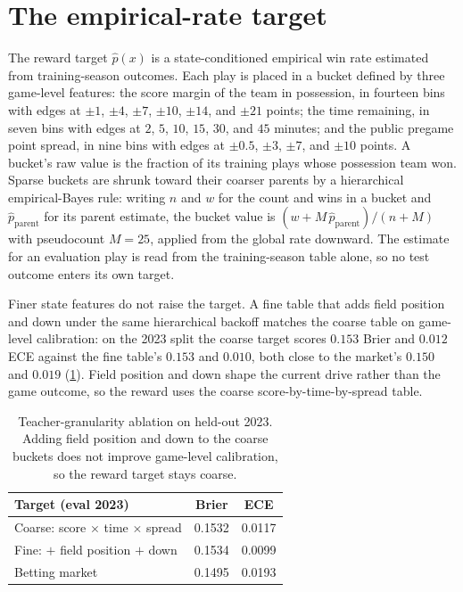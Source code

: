 
\section{The empirical-rate target}
\label{app:teacher}

The reward target $\hat p(x)$ is a state-conditioned empirical win rate estimated from
training-season outcomes. Each play is placed in a bucket defined by three game-level features: the
score margin of the team in possession, in fourteen bins with edges at $\pm1$, $\pm4$, $\pm7$,
$\pm10$, $\pm14$, and $\pm21$ points; the time remaining, in seven bins with edges at $2$, $5$,
$10$, $15$, $30$, and $45$ minutes; and the public pregame point spread, in nine bins with edges at
$\pm0.5$, $\pm3$, $\pm7$, and $\pm10$ points. A bucket's raw value is the fraction of its training
plays whose possession team won. Sparse buckets are shrunk toward their coarser parents by a
hierarchical empirical-Bayes rule: writing $n$ and $w$ for the count and wins in a bucket and
$\hat p_{\text{parent}}$ for its parent estimate, the bucket value is
$(w + M\,\hat p_{\text{parent}})/(n + M)$ with pseudocount $M=25$, applied from the global rate
downward. The estimate for an evaluation play is read from the training-season table alone, so no
test outcome enters its own target.

Finer state features do not raise the target. A fine table that adds field position and down under
the same hierarchical backoff matches the coarse table on game-level calibration: on the 2023 split
the coarse target scores $0.153$ Brier and $0.012$ ECE against the fine table's $0.153$ and $0.010$,
both close to the market's $0.150$ and $0.019$ (\cref{tab:granularity}). Field position and down
shape the current drive rather than the game outcome, so the reward uses the coarse
score-by-time-by-spread table.

\begin{table}[h]
\centering
\small
\begin{tabular}{lcc}
\toprule
Target (eval 2023) & Brier & ECE \\
\midrule
Coarse: score $\times$ time $\times$ spread & 0.1532 & 0.0117 \\
Fine: $+$ field position $+$ down & 0.1534 & 0.0099 \\
Betting market & 0.1495 & 0.0193 \\
\bottomrule
\end{tabular}
\caption{Teacher-granularity ablation on held-out 2023. Adding field position and down to the
coarse buckets does not improve game-level calibration, so the reward target stays coarse.}
\label{tab:granularity}
\end{table}

